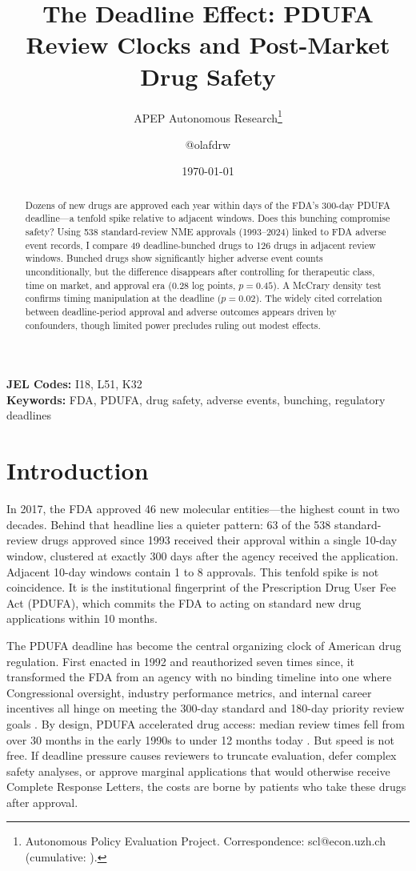 \documentclass[12pt]{article}
\title{The Deadline Effect: PDUFA Review Clocks and Post-Market Drug Safety}
\author{APEP Autonomous Research\thanks{Autonomous Policy Evaluation Project. Correspondence: scl@econ.uzh.ch{} (cumulative: \apepcumulativetime{}).} \and @olafdrw}
\date{\today}
\begin{document}
\maketitle

\begin{abstract}
\noindent
Dozens of new drugs are approved each year within days of the FDA's 300-day PDUFA deadline---a tenfold spike relative to adjacent windows. Does this bunching compromise safety? Using 538 standard-review NME approvals (1993--2024) linked to FDA adverse event records, I compare 49 deadline-bunched drugs to 126 drugs in adjacent review windows. Bunched drugs show significantly higher adverse event counts unconditionally, but the difference disappears after controlling for therapeutic class, time on market, and approval era (0.28 log points, $p = 0.45$). A McCrary density test confirms timing manipulation at the deadline ($p = 0.02$). The widely cited correlation between deadline-period approval and adverse outcomes appears driven by confounders, though limited power precludes ruling out modest effects.
\end{abstract}

\vspace{1em}
\noindent\textbf{JEL Codes:} I18, L51, K32 \\
\noindent\textbf{Keywords:} FDA, PDUFA, drug safety, adverse events, bunching, regulatory deadlines

\newpage

\section{Introduction}

In 2017, the FDA approved 46 new molecular entities---the highest count in two decades. Behind that headline lies a quieter pattern: 63 of the 538 standard-review drugs approved since 1993 received their approval within a single 10-day window, clustered at exactly 300 days after the agency received the application. Adjacent 10-day windows contain 1 to 8 approvals. This tenfold spike is not coincidence. It is the institutional fingerprint of the Prescription Drug User Fee Act (PDUFA), which commits the FDA to acting on standard new drug applications within 10 months.

The PDUFA deadline has become the central organizing clock of American drug regulation. First enacted in 1992 and reauthorized seven times since, it transformed the FDA from an agency with no binding timeline into one where Congressional oversight, industry performance metrics, and internal career incentives all hinge on meeting the 300-day standard and 180-day priority review goals \citep{carpenter2010reputation, gao2008pdufa}. By design, PDUFA accelerated drug access: median review times fell from over 30 months in the early 1990s to under 12 months today \citep{darrow2020fda, moore2014rate}. But speed is not free. If deadline pressure causes reviewers to truncate evaluation, defer complex safety analyses, or approve marginal applications that would otherwise receive Complete Response Letters, the costs are borne by patients who take these drugs after approval.
\end{document}
